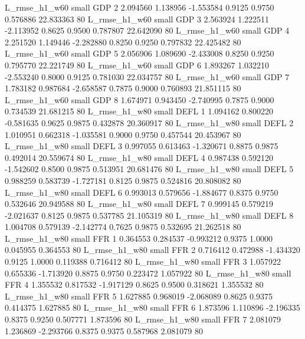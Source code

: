  L_rmse_h1_w60      small      GDP                 2 2.094560 1.138956 -1.553584 0.9125 0.9750  0.576886   22.833363 80
 L_rmse_h1_w60      small      GDP                 3 2.563924 1.222511 -2.113952 0.8625 0.9500  0.787807   22.642090 80
 L_rmse_h1_w60      small      GDP                 4 2.251520 1.149446 -2.282880 0.8250 0.9250  0.797832   22.425482 80
 L_rmse_h1_w60      small      GDP                 5 2.056906 1.089690 -2.433008 0.8250 0.9250  0.795770   22.221749 80
 L_rmse_h1_w60      small      GDP                 6 1.893267 1.032210 -2.553240 0.8000 0.9125  0.781030   22.034757 80
 L_rmse_h1_w60      small      GDP                 7 1.783182 0.987684 -2.658587 0.7875 0.9000  0.760893   21.851115 80
 L_rmse_h1_w60      small      GDP                 8 1.674971 0.943450 -2.740995 0.7875 0.9000  0.734539   21.681215 80
 L_rmse_h1_w80      small     DEFL                 1 1.094162 0.800220 -0.581635 0.9625 0.9875  0.432878   20.360917 80
 L_rmse_h1_w80      small     DEFL                 2 1.010951 0.662318 -1.035581 0.9000 0.9750  0.457544   20.453967 80
 L_rmse_h1_w80      small     DEFL                 3 0.997055 0.613463 -1.320671 0.8875 0.9875  0.492014   20.559674 80
 L_rmse_h1_w80      small     DEFL                 4 0.987438 0.592120 -1.542602 0.8500 0.9875  0.513951   20.681476 80
 L_rmse_h1_w80      small     DEFL                 5 0.988259 0.583739 -1.727181 0.8125 0.9875  0.524816   20.808082 80
 L_rmse_h1_w80      small     DEFL                 6 0.993013 0.579656 -1.884677 0.8375 0.9750  0.532646   20.949588 80
 L_rmse_h1_w80      small     DEFL                 7 0.999145 0.579219 -2.021637 0.8125 0.9875  0.537785   21.105319 80
 L_rmse_h1_w80      small     DEFL                 8 1.004708 0.579139 -2.142774 0.7625 0.9875  0.532695   21.262518 80
 L_rmse_h1_w80      small      FFR                 1 0.364553 0.284537 -0.993212 0.9375 1.0000  0.045955    0.364553 80
 L_rmse_h1_w80      small      FFR                 2 0.716412 0.472988 -1.434320 0.9125 1.0000  0.119388    0.716412 80
 L_rmse_h1_w80      small      FFR                 3 1.057922 0.655336 -1.713920 0.8875 0.9750  0.223472    1.057922 80
 L_rmse_h1_w80      small      FFR                 4 1.355532 0.817532 -1.917129 0.8625 0.9500  0.318621    1.355532 80
 L_rmse_h1_w80      small      FFR                 5 1.627885 0.968019 -2.068089 0.8625 0.9375  0.414375    1.627885 80
 L_rmse_h1_w80      small      FFR                 6 1.873596 1.110896 -2.196335 0.8375 0.9250  0.507771    1.873596 80
 L_rmse_h1_w80      small      FFR                 7 2.081079 1.236869 -2.293766 0.8375 0.9375  0.587968    2.081079 80
